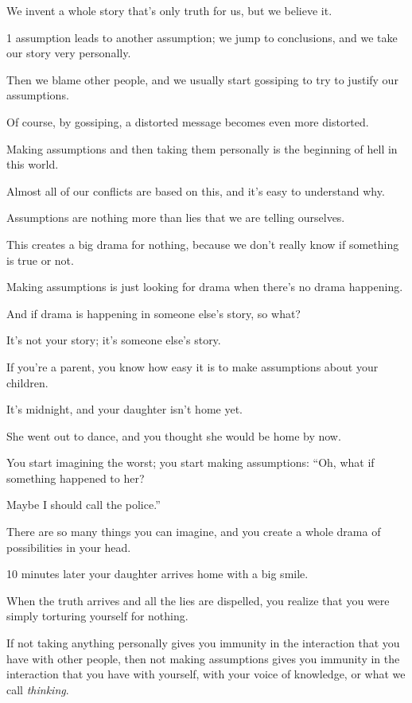 \documentclass{article}
\numberwithin{equation}{section}
\begin{document}
We invent a whole story that's only truth for us, but we believe it.

1 assumption leads to another assumption; we jump to conclusions, and we take our story very personally.

Then we blame other people, and we usually start gossiping to try to justify our assumptions.

Of course, by gossiping, a distorted message becomes even more distorted.

%
Making assumptions and then taking them personally is the beginning of hell in this world.

Almost all of our conflicts are based on this, and it's easy to understand why.

Assumptions are nothing more than lies that we are telling ourselves.

This creates a big drama for nothing, because we don't really know if something is true or not.

Making assumptions is just looking for drama when there's no drama happening.

And if drama is happening in someone else's story, so what?

It's not your story; it's someone else's story.

%

If you're a parent, you know how easy it is to make assumptions about your children.

It's midnight, and your daughter isn't home yet.

She went out to dance, and you thought she would be home by now.

You start imagining the worst; you start making assumptions: ``Oh, what if something happened to her?

Maybe I should call the police.''

There are so many things you can imagine, and you create a whole drama of possibilities in your head.

10 minutes later your daughter arrives home with a big smile.

When the truth arrives and all the lies are dispelled, you realize that you were simply torturing yourself for nothing.


%
If not taking anything personally gives you immunity in the interaction that you have with other people, then not making assumptions gives you immunity in the interaction that you have with yourself, with your voice of knowledge, or what we call \textit{thinking}.
\end{document}
